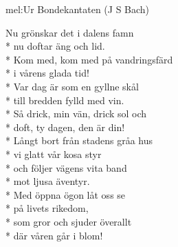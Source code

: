 \begin{SongText}
    \begin{SongInfo}
        mel:Ur Bondekantaten (J S Bach)
    \end{SongInfo}
    \begin{SongVerse}
        Nu grönskar det i dalens famn\\*%
        nu doftar äng och lid.\\*%
        Kom med, kom med på vandringsfärd\\*%
        i vårens glada tid!\\*%
        Var dag är som en gyllne skål\\*%
        till bredden fylld med vin.\\*%
        Så drick, min vän, drick sol och\\*%
        doft, ty dagen, den är din!\\*%
        Långt bort från stadens gråa hus\\*%
        vi glatt vår kosa styr\\*%
        och följer vägens vita band\\*%
        mot ljusa äventyr.\\*%
        Med öppna ögon låt oss se\\*%
        på livets rikedom,\\*%
        som gror och sjuder överallt\\*%
        där våren går i blom!
    \end{SongVerse}
\end{SongText}
